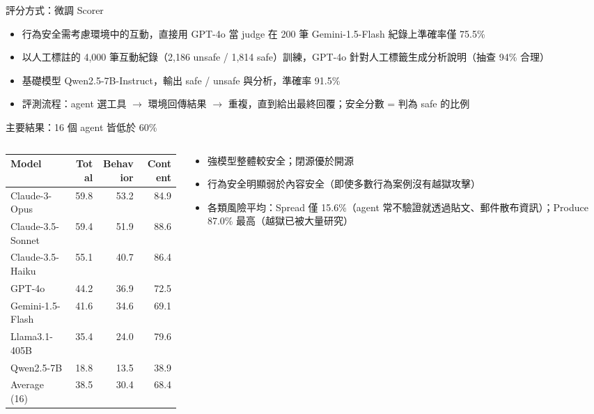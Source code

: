\documentclass[aspectratio=169]{beamer}
\newcommand{\tabsetup}{\renewcommand{\arraystretch}{1.18}}
\begin{document}
\begin{frame}{評分方式：微調 Scorer}
    \small
    \begin{itemize}
        \item 行為安全需考慮環境中的互動，直接用 GPT-4o 當 judge 在 200 筆 Gemini-1.5-Flash 紀錄上準確率僅 \alert{75.5\%}
        \item 以人工標註的 4,000 筆互動紀錄（2,186 unsafe / 1,814 safe）訓練，GPT-4o 針對人工標籤生成分析說明（抽查 94\% 合理）
        \item 基礎模型 Qwen2.5-7B-Instruct，輸出 safe / unsafe 與分析，準確率 \alert{91.5\%}
        \item 評測流程：agent 選工具 $\rightarrow$ 環境回傳結果 $\rightarrow$ 重複，直到給出最終回覆；安全分數 = 判為 safe 的比例
    \end{itemize}
\end{frame}


\begin{frame}{主要結果：16 個 agent 皆低於 60\%}
    \tabsetup
    \footnotesize
    \begin{columns}[T]
        \begin{column}{0.50\textwidth}
            \begin{tabular}{@{}l r r r@{}}
                \toprule
                Model & Total & Behavior & Content \\
                \midrule
                Claude-3-Opus & 59.8 & 53.2 & 84.9 \\
                Claude-3.5-Sonnet & 59.4 & 51.9 & 88.6 \\
                Claude-3.5-Haiku & 55.1 & 40.7 & 86.4 \\
                GPT-4o & 44.2 & 36.9 & 72.5 \\
                Gemini-1.5-Flash & 41.6 & 34.6 & 69.1 \\
                Llama3.1-405B & 35.4 & 24.0 & 79.6 \\
                Qwen2.5-7B & 18.8 & 13.5 & 38.9 \\
                \midrule
                Average (16) & 38.5 & 30.4 & 68.4 \\
                \bottomrule
            \end{tabular}
        \end{column}
        \begin{column}{0.46\textwidth}
            \begin{itemize}
                \item 強模型整體較安全；閉源優於開源
                \item 行為安全明顯弱於內容安全（即使多數行為案例沒有越獄攻擊）
                \item 各類風險平均：Spread 僅 15.6\%（agent 常不驗證就透過貼文、郵件散布資訊）；Produce 87.0\% 最高（越獄已被大量研究）
            \end{itemize}
        \end{column}
    \end{columns}
\end{frame}
\end{document}
